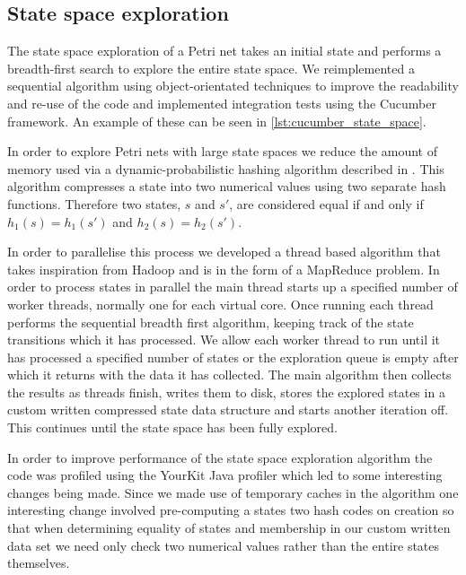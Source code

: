 \subsection{State space exploration}
The state space exploration of a Petri net takes an initial state and performs a breadth-first search to explore the entire state space. We reimplemented a sequential algorithm using object-orientated techniques to improve the readability and re-use of the code and implemented integration tests using the Cucumber framework. An example of these can be seen in \cref{lst:cucumber_state_space}.



In order to explore Petri nets with large state spaces we reduce the amount of memory used via a dynamic-probabilistic hashing algorithm described in \cite{knottenbelt1996generalised}. This algorithm compresses a state into two numerical values using two separate hash functions. Therefore two states, $s$ and $s'$, are considered equal if and only if $h_1(s) = h_1(s')$ and $h_2(s) = h_2(s')$.

In order to parallelise this process we developed a thread based algorithm that takes inspiration from Hadoop and is in the form of a MapReduce problem. In order to process states in parallel the main thread starts up a specified number of worker threads, normally one for each virtual core. Once running each thread performs the sequential breadth first algorithm, keeping track of the state transitions which it has processed. 
We allow each worker thread to run until it has processed a specified number of states or the exploration queue is empty after which it returns with the data it has collected. The main algorithm then collects the results as threads finish, writes them to disk, stores the explored states in a custom written compressed state data structure and starts another iteration off. This continues until the state space has been fully explored.

In order to improve performance of the state space exploration algorithm the code was profiled using the YourKit Java profiler which led to some interesting changes being made. Since we made use of temporary caches in the algorithm one interesting change involved pre-computing a states two hash codes on creation so that when determining equality of states and membership in our custom written data set we need only check two numerical values rather than the entire states themselves. 